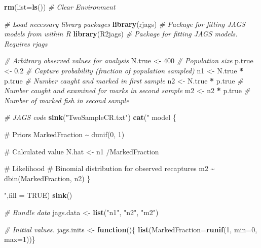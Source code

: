 \documentclass[
]{krantz}
\makeatletter
\newenvironment{Shaded}{\begin{snugshade}}{\end{snugshade}}
\newcommand{\AttributeTok}[1]{\textcolor[rgb]{0.27,0.27,0.27}{#1}}
\newcommand{\CommentTok}[1]{\textcolor[rgb]{0.37,0.37,0.37}{\textit{#1}}}
\newcommand{\ConstantTok}[1]{\textcolor[rgb]{0.37,0.37,0.37}{#1}}
\newcommand{\ControlFlowTok}[1]{\textcolor[rgb]{0.27,0.27,0.27}{\textbf{#1}}}
\newcommand{\DecValTok}[1]{\textcolor[rgb]{0.06,0.06,0.06}{#1}}
\newcommand{\FloatTok}[1]{\textcolor[rgb]{0.06,0.06,0.06}{#1}}
\newcommand{\FunctionTok}[1]{\textcolor[rgb]{0.27,0.27,0.27}{\textbf{#1}}}
\newcommand{\NormalTok}[1]{#1}
\newcommand{\OtherTok}[1]{\textcolor[rgb]{0.37,0.37,0.37}{#1}}
\newcommand{\SpecialCharTok}[1]{\textcolor[rgb]{0.43,0.43,0.43}{\textbf{#1}}}
\newcommand{\StringTok}[1]{\textcolor[rgb]{0.5,0.5,0.5}{#1}}
\newenvironment{kframe}{%
\medskip{}
\setlength{\fboxsep}{.8em}
 \def\at@end@of@kframe{}%
 \ifinner\ifhmode%
  \def\at@end@of@kframe{\end{minipage}}%
  \begin{minipage}{\columnwidth}%
 \fi\fi%
 \def\FrameCommand##1{\hskip\@totalleftmargin \hskip-\fboxsep
 \colorbox{shadecolor}{##1}\hskip-\fboxsep
     \hskip-\linewidth \hskip-\@totalleftmargin \hskip\columnwidth}%
 \MakeFramed {\advance\hsize-\width
   \@totalleftmargin\z@ \linewidth\hsize
   \@setminipage}}%
 {\par\unskip\endMakeFramed%
 \at@end@of@kframe}
\renewenvironment{Shaded}{\begin{kframe}}{\end{kframe}}
\makeatother
\begin{document}
\begin{Shaded}
\begin{Highlighting}[]
\FunctionTok{rm}\NormalTok{(}\AttributeTok{list=}\FunctionTok{ls}\NormalTok{()) }\CommentTok{\# Clear Environment}

\CommentTok{\# Load necessary library packages}
\FunctionTok{library}\NormalTok{(rjags)   }\CommentTok{\# Package for fitting JAGS models from within R}
\FunctionTok{library}\NormalTok{(R2jags)  }\CommentTok{\# Package for fitting JAGS models. Requires rjags}

\CommentTok{\# Arbitrary \textquotesingle{}observed\textquotesingle{} values for analysis}
\NormalTok{N.true }\OtherTok{\textless{}{-}} \DecValTok{400}  \CommentTok{\# Population size}
\NormalTok{p.true }\OtherTok{\textless{}{-}} \FloatTok{0.2} \CommentTok{\# Capture probability (fraction of population sampled)}
\NormalTok{n1 }\OtherTok{\textless{}{-}}\NormalTok{ N.true }\SpecialCharTok{*}\NormalTok{ p.true }\CommentTok{\# Number caught and marked in first sample}
\NormalTok{n2 }\OtherTok{\textless{}{-}}\NormalTok{ N.true }\SpecialCharTok{*}\NormalTok{ p.true }\CommentTok{\# Number caught and examined for marks in second sample}
\NormalTok{m2 }\OtherTok{\textless{}{-}}\NormalTok{ n2 }\SpecialCharTok{*}\NormalTok{ p.true }\CommentTok{\# Number of marked fish in second sample}

\CommentTok{\# JAGS code}
\FunctionTok{sink}\NormalTok{(}\StringTok{"TwoSampleCR.txt"}\NormalTok{)}
\FunctionTok{cat}\NormalTok{(}\StringTok{"}
\StringTok{    model \{}

\StringTok{    \# Priors}
\StringTok{    MarkedFraction \textasciitilde{} dunif(0, 1)}

\StringTok{    \# Calculated value}
\StringTok{    N.hat \textless{}{-} n1 /MarkedFraction}

\StringTok{    \# Likelihood}
\StringTok{    \# Binomial distribution for observed recaptures}
\StringTok{    m2 \textasciitilde{} dbin(MarkedFraction, n2)}
\StringTok{    \}}

\StringTok{    "}\NormalTok{,}\AttributeTok{fill =} \ConstantTok{TRUE}\NormalTok{)}
\FunctionTok{sink}\NormalTok{()}

\CommentTok{\# Bundle data}
\NormalTok{jags.data }\OtherTok{\textless{}{-}} \FunctionTok{list}\NormalTok{(}\StringTok{"n1"}\NormalTok{, }\StringTok{"n2"}\NormalTok{, }\StringTok{"m2"}\NormalTok{)}

\CommentTok{\# Initial values.}
\NormalTok{jags.inits }\OtherTok{\textless{}{-}} \ControlFlowTok{function}\NormalTok{()\{ }\FunctionTok{list}\NormalTok{(}\AttributeTok{MarkedFraction=}\FunctionTok{runif}\NormalTok{(}\DecValTok{1}\NormalTok{, }\AttributeTok{min=}\DecValTok{0}\NormalTok{, }\AttributeTok{max=}\DecValTok{1}\NormalTok{))\}}


\end{Highlighting}
\end{Shaded}
\end{document}

